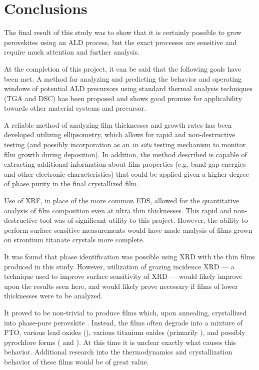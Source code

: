 \chapter{Conclusions}
\label{ch:Conc}
\thispagestyle{empty}


The final result of this study was to show that it is certainly possible to grow perovskites using an ALD process, but the exact processes are sensitive and require much attention and further analysis.  

At the completion of this project, it can be said that the following goals have been met. A method for analyzing and predicting the behavior and operating windows of potential ALD precursors using standard thermal analysis techniques (TGA and DSC) has been proposed and shows good promise for applicability towards other material systems and precursor. 

A reliable method of analyzing film thicknesses and growth rates has been developed utilizing ellipsometry, which allows for rapid and non-destructive testing (and possibly incorporation as an \emph{in situ} testing mechanism to monitor film growth during deposition). In addition, the method described is capable of extracting additional information about film properties (e.g. band gap energies and other electronic characteristics) that could be applied given a higher degree of phase purity in the final crystallized film. 

Use of XRF, in place of the more common EDS, allowed for the quantitative analysis of film composition even at ultra thin thicknesses. This rapid and non-destructive tool was of significant utility to this project. However, the ability to perform surface sensitive measurements would have made analysis of films grown on strontium titanate crystals more complete. 

It was found that phase identification was possible using XRD with the thin films produced in this study. However, utilization of grazing incidence XRD --- a technique used to improve surface sensitivity of XRD --- would likely improve upon the results seen here, and would likely prove necessary if films of lower thicknesses were to be analyzed. 

It proved to be non-trivial to produce films which, upon annealing, crystallized into phase-pure perovskite \PTO{}. Instead, the films often degrade into a mixture of PTO, various lead oxides (), various titanium oxides (primarily ), and possibly pyrochlore forms ( and ). At this time it is unclear exactly what causes this behavior. Additional research into the thermodynamics and crystallization behavior of these films would be of great value. 

